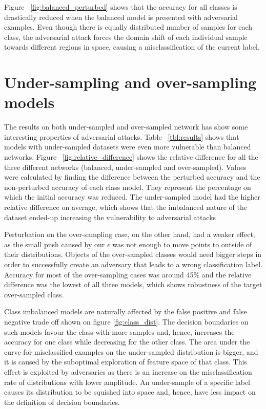 Figure ~\ref{fig:balanced_perturbed} shows that the accuracy for all classes is drastically reduced when the balanced model is presented with adversarial examples. Even though there is equally distributed number of samples for each class, the adversarial attack forces the domain shift of each individual sample towards different regions in space, causing a misclassification of the current label.

\section{Under-sampling and over-sampling models}


The results on both under-sampled and over-sampled network has show some interesting properties of adversarial attacks. 
Table ~\ref{tbl:results} shows that models with under-sampled datasets were even more vulnerable than balanced networks. Figure ~\ref{fig:relative_difference} shows the relative difference for all the three different networks (balanced, under-sampled and over-sampled). Values were calculated by finding the difference between the perturbed accuracy and the non-perturbed accuracy of each class model. They represent the percentage on which the initial accuracy was reduced. The under-sampled model had the higher relative difference on average, which shows that the imbalanced nature of the dataset ended-up increasing the vulnerability to adversarial attacks

Perturbation on the over-sampling case, on the other hand, had a weaker effect, as the small push caused by our $\epsilon$ was not enough to move points to outside of their distributions. Objects of the over-sampled classes would need bigger steps in order to successfully create an adversary that leads to a wrong classification label. Accuracy for
most of the over-sampling cases was around 45\% and the relative difference was the lowest of all three models, which shows robustness of the target over-sampled class.

Class imbalanced models are naturally affected by the false positive and false negative trade off shown on figure \ref{fig:class_dist}. The decision boundaries on such models favour the class with more samples and, hence, increases the accuracy for one class while decreasing for the other class. The area under the curve for misclassified examples on the under-sampled distribution is bigger, and it is caused by the suboptimal exploration of feature space of that class. This effect is exploited by adversaries as there is an increase on the misclassification rate of distributions with lower amplitude. An under-sample of a specific label causes its distribution to be squished into space and, hence, have less impact on the definition of decision boundaries.

